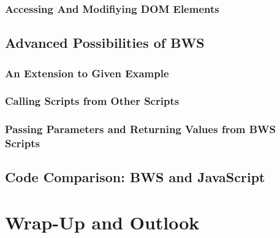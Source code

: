  

  \subsubsection{Accessing And Modifiying DOM Elements}


 \subsection{Advanced Possibilities of BWS}
  \subsubsection{An Extension to Given Example}
  \subsubsection{Calling Scripts from Other Scripts}
  \subsubsection{Passing Parameters and Returning Values from BWS Scripts}
 \subsection{Code Comparison: BWS and JavaScript}
\section{Wrap-Up and Outlook}